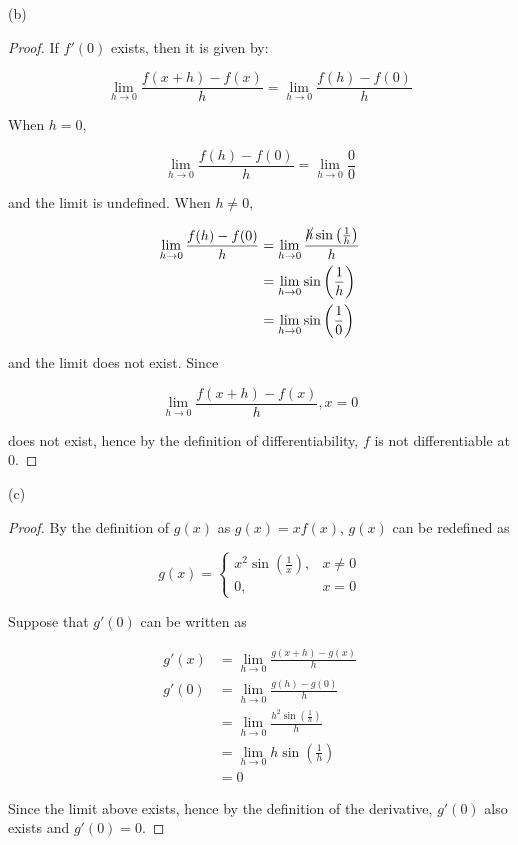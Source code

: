 \documentclass{article}
\begin{document}
    (b)
    \begin{proof}
        If $f'(0)$ exists, then it is given by:

        \[
            \lim_{h\to 0} \frac{f(x+h)-f(x)}{h} = \lim_{h\to 0} \frac{f(h) - f(0)}{h}
        \]

        When $h=0$,

        \[
            \lim_{h\to 0} \frac{f(h) - f(0)}{h} = \lim_{h\to 0} \frac{0}{0}
        \]

       and the limit is undefined. When $h\not = 0$,

        \begin{align*}
            \lim_{h\to 0} \frac{f(h) - f(0)}{h} &= \lim_{h\to 0} \frac{\cancel{h}\sin{\left(\frac{1}{h}\right)}}{h} \\
                                                &= \lim_{h\to 0} \sin{\left(\frac{1}{h}\right)} \\
                                                &= \lim_{h\to 0} \sin{\left(\frac{1}{0}\right)}
        \end{align*}

       and the limit does not exist. Since

        \[
            \lim_{h\to 0} \frac{f(x+h)-f(x)}{h}, x = 0
        \]

        does not exist, hence by the definition of differentiability, $f$ is not differentiable at 0.
    \end{proof}

    (c)
    \begin{proof}
        By the definition of $g(x)$ as $g(x)=xf(x)$, $g(x)$ can be redefined as

        \[
            g(x) =
            \begin{cases}
                x^2 \sin{\left(\frac{1}{x}\right)}, & x \not = 0 \\
                0,                                  & x = 0
            \end{cases}
        \]

        Suppose that $g'(0)$ can be written as

        \begin{align*}
            g'(x) &= \lim_{h\to 0} \frac{g(x+h)-g(x)}{h} \\
            g'(0) &= \lim_{h\to 0} \frac{g(h) - g(0)}{h} \\
                  &= \lim_{h\to 0} \frac{h^2 \sin{\left(\frac{1}{h}\right)}}{h} \\
                  &= \lim_{h\to 0} h\sin{\left(\frac{1}{h}\right)} \\
                  &= 0
        \end{align*}

        Since the limit above exists, hence by the definition of the derivative, $g'(0)$ also exists and $g'(0)=0$.
    \end{proof}
\end{document}
